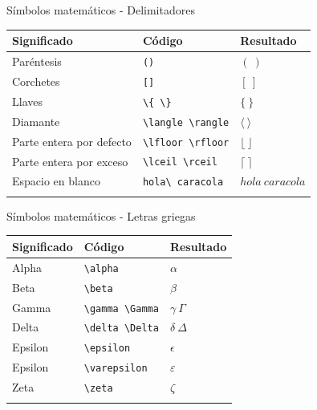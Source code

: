 \documentclass[
  ignorenonframetext,
]{beamer}
\begin{document}
\begin{frame}[fragile]{Símbolos matemáticos - Delimitadores}
\label{suxedmbolos-matemuxe1ticos---delimitadores}
\begin{longtable}[]{@{}lll@{}}
\toprule\noalign{}
Significado & Código & Resultado \\
\midrule\noalign{}
\endhead
Paréntesis & \texttt{()} & \((\ )\) \\
Corchetes & \texttt{{[}{]}} & \([\ ]\) \\
Llaves & \texttt{\textbackslash{}\{\ \textbackslash{}\}} & \(\{\ \}\) \\
Diamante & \texttt{\textbackslash{}langle\ \textbackslash{}rangle} &
\(\langle\ \rangle\) \\
Parte entera por defecto &
\texttt{\textbackslash{}lfloor\ \textbackslash{}rfloor} &
\(\lfloor\  \rfloor\) \\
Parte entera por exceso &
\texttt{\textbackslash{}lceil\ \textbackslash{}rceil} &
\(\lceil\ \rceil\) \\
Espacio en blanco & \texttt{hola\textbackslash{}\ caracola} &
\(hola\ caracola\) \\
\bottomrule\noalign{}
\end{longtable}
\end{frame}

\begin{frame}[fragile]{Símbolos matemáticos - Letras griegas}
\label{suxedmbolos-matemuxe1ticos---letras-griegas}
\begin{longtable}[]{@{}lll@{}}
\toprule\noalign{}
Significado & Código & Resultado \\
\midrule\noalign{}
\endhead
Alpha & \texttt{\textbackslash{}alpha} & \(\alpha\) \\
Beta & \texttt{\textbackslash{}beta} & \(\beta\) \\
Gamma & \texttt{\textbackslash{}gamma\ \textbackslash{}Gamma} &
\(\gamma\  \Gamma\) \\
Delta & \texttt{\textbackslash{}delta\ \textbackslash{}Delta} &
\(\delta\  \Delta\) \\
Epsilon & \texttt{\textbackslash{}epsilon} & \(\epsilon\) \\
Epsilon & \texttt{\textbackslash{}varepsilon} & \(\varepsilon\) \\
Zeta & \texttt{\textbackslash{}zeta} & \(\zeta\) \\
\bottomrule\noalign{}
\end{longtable}
\end{frame}
\end{document}
